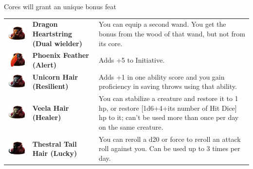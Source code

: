 Cores will grant an unique bonus feat \\

\begin{tabular}{ m{4cm}m{3cm}m{6cm} } 
	\includegraphics[width=4cm]{../Pictures/Gameplay/Items/Wearables/Wand/Cores/Dragon_heartstring_icon.png} & \textbf{Dragon Heartstring (Dual wielder)} & You can equip a second wand. You get the bonus from the wood of that wand, but not from its core. \\ 
	\includegraphics[width=4cm]{../Pictures/Gameplay/Items/Wearables/Wand/Cores/Phoenix_feather_icon.png} & \textbf{Phoenix Feather (Alert)} & Adds +5 to Initiative. \\ 
	\includegraphics[width=4cm]{../Pictures/Gameplay/Items/Wearables/Wand/Cores/Unicorn_hair_icon.png} & \textbf{Unicorn Hair (Resilient)} & Adds +1 in one ability score and you gain proficiency in saving throws using that ability.  \\ 
	\includegraphics[width=4cm]{../Pictures/Gameplay/Items/Wearables/Wand/Cores/Veela_hair_icon.png} & \textbf{Veela Hair (Healer)} & You can stabilize a creature and restore it to 1 hp, or restore [1d6+4+its number of Hit Dice] hp to it; can't be used more than once per day on the same creature. \\ 
	\includegraphics[width=4cm]{../Pictures/Gameplay/Items/Wearables/Wand/Cores/Thestral_tail_hair_icon.png} & \textbf{Thestral Tail Hair (Lucky)} & You can reroll a d20 or force to reroll an attack roll against you. Can be used up to 3 times per day. \\ 
\end{tabular}

\clearpage